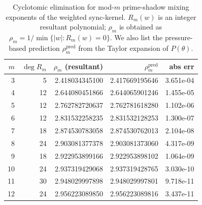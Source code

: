 \begin{table}[H]
\centering
\scriptsize
\setlength{\tabcolsep}{6pt}
\caption{Cyclotomic elimination for mod-$m$ prime-shadow mixing exponents of the weighted sync-kernel. $R_m(w)$ is an integer resultant polynomial; $\rho_m$ is obtained as $\rho_m=1/\min\{|w|:R_m(w)=0\}$. We also list the pressure-based prediction $\rho_m^{\mathrm{pred}}$ from the Taylor expansion of $P(\theta)$.}
\label{tab:sync_kernel_cyclotomic_elimination_summary}
\begin{tabular}{r r r r r}
\toprule
$m$ & $\deg R_m$ & $\rho_m$ (resultant) & $\rho_m^{\mathrm{pred}}$ & abs err\\
\midrule
3 & 5 & 2.418034345100 & 2.417669195646 & 3.651e-04\\
4 & 12 & 2.644080451866 & 2.644065901246 & 1.455e-05\\
5 & 12 & 2.762782720637 & 2.762781618280 & 1.102e-06\\
6 & 12 & 2.831532258235 & 2.831532128253 & 1.300e-07\\
7 & 18 & 2.874530783058 & 2.874530762013 & 2.104e-08\\
8 & 24 & 2.903081377378 & 2.903081373060 & 4.317e-09\\
9 & 18 & 2.922953899166 & 2.922953898102 & 1.064e-09\\
10 & 24 & 2.937319429068 & 2.937319428765 & 3.030e-10\\
11 & 30 & 2.948029997898 & 2.948029997801 & 9.718e-11\\
12 & 24 & 2.956223089850 & 2.956223089816 & 3.437e-11\\
\bottomrule
\end{tabular}
\end{table}
